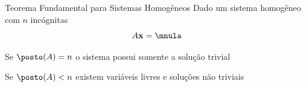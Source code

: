 \documentclass[fleqn,aspectratio=169,12pt]{beamer}
\begin{document}



\begin{frame}{Teorema Fundamental para Sistemas Homogêneos}
  Dado um sistema homogêneo com $n$ incógnitas
  \[
    A \mathbf{x} = \mnula
  \]

  \pause
  \medskip
  Se
  \;\(
    \posto(A) = n
  \)\;
  \pause
  o sistema possui somente a solução trivial

  \pause
  \medskip
  Se
  \:\(
    \posto(A) < n
  \)\:
  \pause
  existem variáveis livres e   soluções não triviais
\end{frame}

%
%

\end{document}
